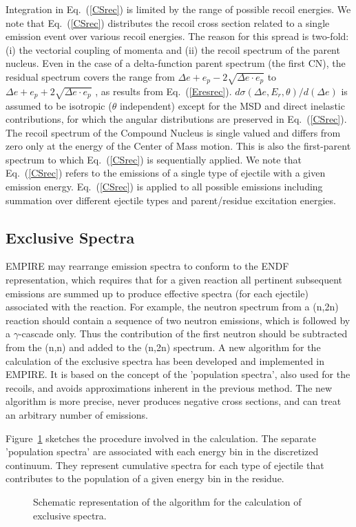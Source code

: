 Integration in Eq.~(\ref{CSrec}) is limited by the range of possible recoil
energies. We note that Eq.~(\ref{CSrec}) distributes the recoil cross section
related to a single emission event over various recoil energies. The reason
for this spread is two-fold: (i) the vectorial coupling of momenta and (ii)
the recoil spectrum of the parent nucleus. Even in the case of a delta-function
parent spectrum (the first CN), the residual spectrum covers the range from $%
\Delta e+e_{p}-2\sqrt{\Delta e\cdot e_{p}}$ to $\Delta e+e_{p}+2\sqrt{\Delta
e\cdot e_{p}}$ , as results from Eq.~(\ref{Eresrec}). $d\sigma(\Delta
e,E_{r},\theta)/d(\Delta e)$ is assumed to be isotropic ($\theta$
independent) except for the MSD%
 and direct inelastic contributions, for which the angular
distributions are preserved in Eq.~(\ref{CSrec}). The recoil spectrum of the
Compound Nucleus is single valued and differs from zero only at the energy
of the Center of Mass motion. This is also the first-parent spectrum to
which Eq.~(\ref{CSrec}) is sequentially applied. We note that Eq.~(\ref{CSrec})
refers to the emissions of a single type of ejectile with a given emission
energy. Eq.~(\ref{CSrec}) is applied to all possible emissions including
summation over different ejectile types and parent/residue excitation
energies.

\subsection{Exclusive Spectra}

EMPIRE may rearrange emission spectra to conform to the ENDF representation,
which requires that for a given reaction all pertinent subsequent emissions
are summed up to produce effective spectra (for each ejectile) associated
with the reaction. For example, the neutron spectrum from a (n,2n) reaction
should contain a sequence of two neutron emissions, which is followed by a
$\gamma$-cascade only. Thus the contribution of the first neutron should be
subtracted from the (n,n) and added to the (n,2n) spectrum. A new algorithm
for the calculation of the exclusive spectra has been developed and implemented
in EMPIRE. It is based on the concept of the 'population spectra', also used
for the recoils, and avoids approximations inherent in the previous method.
The new algorithm is more precise, never produces negative cross sections,
and can treat an arbitrary number of emissions.

Figure~\ref{exclusive} sketches the procedure involved in the calculation.
The separate 'population spectra' are associated with each energy bin in the
discretized continuum. They represent cumulative spectra for each type of
ejectile that contributes to the population of a given energy bin in the
residue.
\begin{figure}[htbp]
\caption{Schematic representation of the algorithm for the calculation of
exclusive spectra.}
\label{exclusive}
\end{figure}

